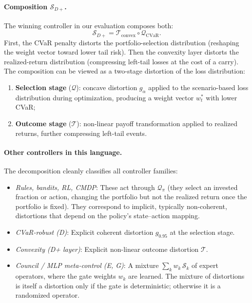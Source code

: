 \documentclass[11pt]{article}
\begin{document}
\paragraph{Composition $\mathcal{S}_{D+}$.}
The winning controller in our evaluation composes both:
\[
\mathcal{S}_{D+}
  =\mathcal{T}_{\text{convex}}\circ\mathcal{Q}_{\text{CVaR}}.
\]
First, the CVaR penalty distorts the portfolio-selection distribution
(reshaping the weight vector toward lower tail risk). Then the convexity
layer distorts the realized-return distribution (compressing left-tail
losses at the cost of a carry). The composition can be viewed as a
two-stage distortion of the loss distribution:
\begin{enumerate}[leftmargin=1.5em,itemsep=1pt]
\item \textbf{Selection stage} ($\mathcal{Q}$): concave distortion
  $g_\alpha$ applied to the scenario-based loss distribution during
  optimization, producing a weight vector $w_t^*$ with lower CVaR;
\item \textbf{Outcome stage} ($\mathcal{T}$): non-linear payoff
  transformation applied to realized returns, further compressing
  left-tail events.
\end{enumerate}

\paragraph{Other controllers in this language.}
The decomposition cleanly classifies all controller families:
\begin{itemize}[leftmargin=1.5em,itemsep=1pt]
\item \emph{Rules, bandits, RL, CMDP}: These act through
  $\mathcal{Q}_\pi$ (they select an invested fraction or action, changing
  the portfolio but not the realized return once the portfolio is fixed).
  They correspond to implicit, typically non-coherent, distortions that
  depend on the policy's state--action mapping.
\item \emph{CVaR-robust (D)}: Explicit coherent distortion
  $g_{0.95}$ at the selection stage.
\item \emph{Convexity (D+ layer)}: Explicit non-linear outcome
  distortion $\mathcal{T}$.
\item \emph{Council / MLP meta-control (E, G)}: A mixture
  $\sum_k w_k\,\mathcal{S}_k$ of expert operators, where the gate
  weights $w_k$ are learned. The mixture of distortions is itself a
  distortion only if the gate is deterministic; otherwise it is a
  randomized operator.
\end{itemize}
\end{document}
